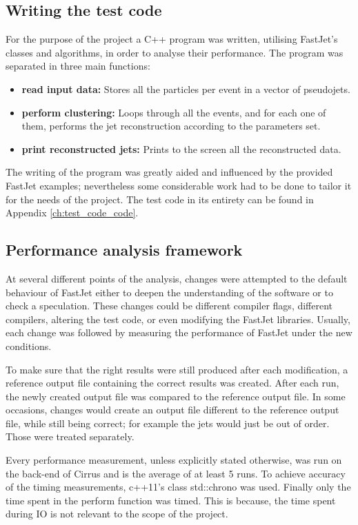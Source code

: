 \subsection{Writing the test code}\label{ch:testcode}
For the purpose of the project a C++ program was written, utilising FastJet's classes and algorithms, in order to analyse their performance. The program was separated in three main functions:
\begin{itemize}
    \item \textbf{read input data:} Stores all the particles per event in a vector of pseudojets.    
    \item \textbf{perform clustering:}
    Loops through all the events, and for each one of them, performs the jet reconstruction according to the parameters set.
    \item \textbf{print reconstructed jets:}
    Prints to the screen all the reconstructed data.
\end{itemize}

The writing of the program was greatly aided and influenced by the provided FastJet examples; nevertheless some considerable work had to be done to tailor it for the needs of the project. The test code in its entirety can be found in Appendix \ref{ch:test_code_code}. 

\subsection{Performance analysis framework}
At several different points of the analysis, changes were attempted to the default behaviour of FastJet either to deepen the understanding of the software or to check a speculation. These changes could be different compiler flags, different compilers, altering the test code, or even modifying the FastJet libraries. Usually, each change was followed by measuring the performance of FastJet under the new conditions.

To make sure that the right results were still produced after each modification, a reference output file containing the correct results was created. After each run, the newly created output file was compared to the reference output file. In some occasions, changes would create an output file different to the reference output file, while still being correct; for example the jets would just be out of order. Those were treated separately.

Every performance measurement, unless explicitly stated otherwise, was run on the back-end of Cirrus and is the average of at least 5 runs. To achieve accuracy of the timing measurements, c++11's class std::chrono was used. Finally on\textbf{}ly the time spent in the perform function was timed. This is because, the time spent during IO is not relevant to the scope of the project.



